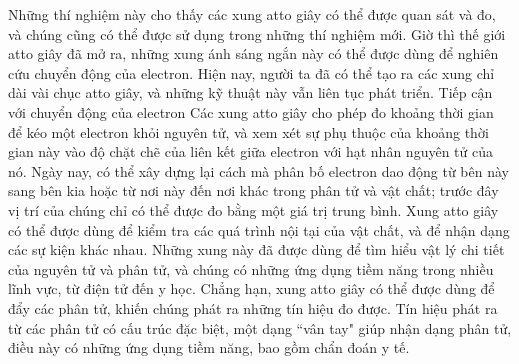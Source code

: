 \begin{multicols}{2}
	\vskip 0.1cm
	Những thí nghiệm này cho thấy các xung atto giây có thể được quan sát và đo, và chúng cũng có thể được sử dụng trong những thí nghiệm mới.
	\vskip 0.1cm
	Giờ thì thế giới atto giây đã mở ra, những xung ánh sáng ngắn này có thể được dùng để nghiên cứu chuyển động của electron. Hiện nay, người ta đã có thể tạo ra các xung chỉ dài vài chục atto giây, và những kỹ thuật này vẫn liên tục phát triển.
	\vskip 0.1cm
	Tiếp cận với chuyển động của electron
	\vskip 0.1cm
	Các xung atto giây cho phép đo khoảng thời gian để kéo một electron khỏi nguyên tử, và xem xét sự phụ thuộc của khoảng thời gian này vào độ chặt chẽ của liên kết giữa electron với hạt nhân nguyên tử của nó. Ngày nay, có thể xây dựng lại cách mà phân bố electron dao động từ bên này sang bên kia hoặc từ nơi này đến nơi khác trong phân tử và vật chất; trước đây vị trí của chúng chỉ có thể được đo bằng một giá trị trung bình.
	\vskip 0.1cm
	Xung atto giây có thể được dùng để kiểm tra các quá trình nội tại của vật chất, và để nhận dạng các sự kiện khác nhau. Những xung này đã được dùng để tìm hiểu vật lý chi tiết của nguyên tử và phân tử, và chúng có những ứng dụng tiềm năng trong nhiều lĩnh vực, từ điện tử đến y học.
	\vskip 0.1cm
	Chẳng hạn, xung atto giây có thể được dùng để đẩy các phân tử, khiến chúng phát ra những tín hiệu đo được. Tín hiệu phát ra từ các phân tử có cấu trúc đặc biệt, một dạng ``vân tay" giúp nhận dạng phân tử, điều này có những ứng dụng tiềm năng, bao gồm chẩn đoán y tế.
\end{multicols}